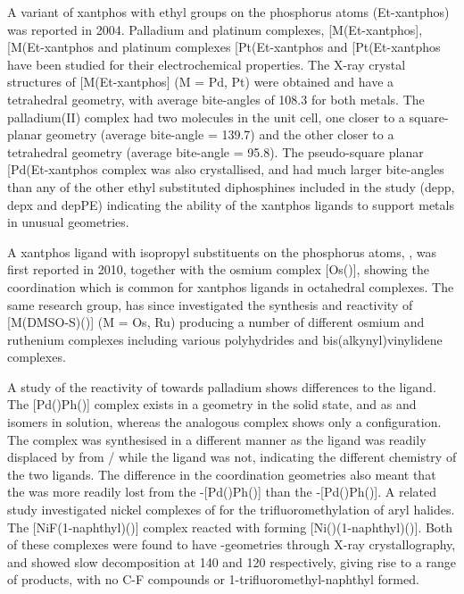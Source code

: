 A variant of xantphos with ethyl groups on the phosphorus atoms (Et-xantphos) was reported in 2004.\cite{Miedaner2004, Raebiger2004}  Palladium and platinum complexes, [M(Et-xantphos], [M(Et-xantphos\ce{)2]^{2+}} and platinum complexes [Pt(Et-xantphos\ce{)2H]PF6} and [Pt(Et-xantphos\ce{)2(H)2]^{2+}} have been studied for their electrochemical properties.  The X-ray crystal structures of [M(Et-xantphos] (M = Pd, Pt) were obtained and have a tetrahedral geometry, with average bite-angles of 108.3\degrees{} for both metals.  The palladium(II) complex had two molecules in the unit cell, one closer to a square-planar geometry (average bite-angle = 139.7\degrees) and the other closer to a tetrahedral geometry (average bite-angle = 95.8\degrees).  The pseudo-square planar [Pd(Et-xantphos\ce{)2](BF4)2} complex was also crystallised, and had much larger bite-angles than any of the other ethyl substituted diphosphines included in the study (\gls{depp}, \gls{depx} and \gls{depPE}) indicating the ability of the xantphos ligands to support metals in unusual geometries.  

A xantphos ligand with isopropyl substituents on the phosphorus atoms, \iPrxantphos{}, was first reported in 2010, together with the osmium complex [Os(\iPrxantphosk)], showing the \POP{} coordination which is common for xantphos ligands in octahedral complexes.\cite{Asensio2010}  The same research group, has since investigated the synthesis and reactivity of [M(DMSO-\dento{}S)(\iPrxantphos)] (M = Os, Ru) producing a number of different osmium and ruthenium complexes including various polyhydrides and bis(alkynyl)vinylidene complexes.\cite{Alos2013, Alos2014}  

A study of the reactivity of \iPrxantphos{} towards palladium shows differences to the \Phxantphos{} ligand.\cite{Bakhmutov2012}  The [Pd()Ph(\Phxantphos)] complex exists in a \cis{} geometry in the solid state, and as \cis{} and \trans{} isomers in solution, whereas the analogous \iPrxantphos{} complex shows only a \trans{} configuration.  The \iPrxantphos{} complex was synthesised in a different manner as the \Phxantphos{} ligand was readily displaced by  from / while the \iPrxantphos{} ligand was not, indicating the different chemistry of the two ligands.  The difference in the coordination geometries also meant that the  was more readily lost from the \cis-[Pd()Ph(\Phxantphos)] than the \trans-[Pd()Ph(\iPrxantphos)].  A related study investigated nickel complexes of \iPrxantphos{} for the trifluoromethylation of aryl halides.\cite{Jover2014}  The [NiF(1-naphthyl)(\iPrxantphos)] complex reacted with  forming [Ni()(1-naphthyl)(\iPrxantphos)].  Both of these complexes were found to have \trans{}-geometries through X-ray crystallography, and showed slow decomposition at 140 \degC{} and 120 \degC{} respectively, giving rise to a range of products, with no C-F compounds or 1-trifluoromethyl-naphthyl formed.  

